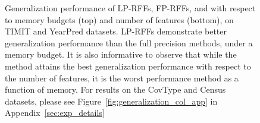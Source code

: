 \begin{figure}
\begin{tabular}{c@{\hskip 0in}c@{\hskip 0in}c@{\hskip 0in}c}
	\end{tabular}
	\caption{Generalization performance of LP-RFFs, FP-RFFs, and \Nystrom with respect to memory budgets (top) and number of features (bottom), on TIMIT and YearPred datasets.  LP-RFFs demonstrate better generalization performance than the full precision methods, under a memory budget. It is also informative to observe that while the \Nystrom method attains the best generalization performance with respect to the number of features, it is the worst performance method as a function of memory.
	For results on the CovType and Census datasets, please see Figure~\ref{fig:generalization_col_app} in Appendix~\ref{sec:exp_details}
}
	\label{fig:generalization_col}
\end{figure}


